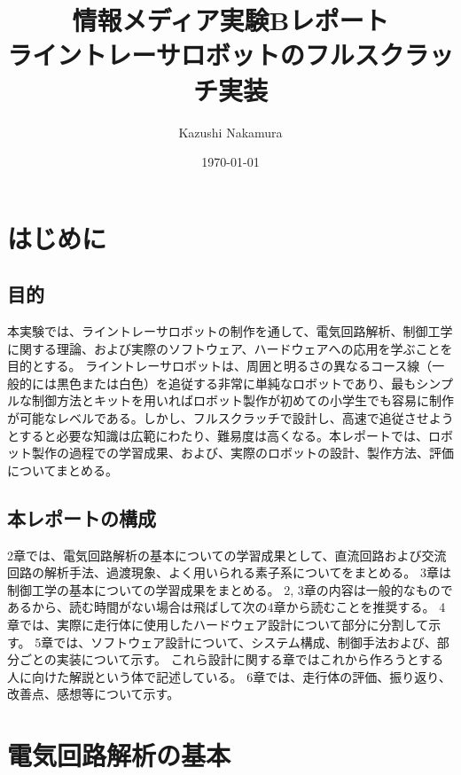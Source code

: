 \documentclass{ltjsreport}
\title{情報メディア実験Bレポート\\ライントレーサロボットのフルスクラッチ実装}
\author{Kazushi Nakamura}
\date{\today}
\begin{document}
\maketitle



\tableofcontents

\chapter{はじめに}


\section{目的}
本実験では、ライントレーサロボットの制作を通して、電気回路解析、制御工学に関する理論、および実際のソフトウェア、ハードウェアへの応用を学ぶことを目的とする。
ライントレーサロボットは、周囲と明るさの異なるコース線（一般的には黒色または白色）を追従する非常に単純なロボットであり、最もシンプルな制御方法とキットを用いればロボット製作が初めての小学生でも容易に制作が可能なレベルである。しかし、フルスクラッチで設計し、高速で追従させようとすると必要な知識は広範にわたり、難易度は高くなる。本レポートでは、ロボット製作の過程での学習成果、および、実際のロボットの設計、製作方法、評価についてまとめる。

\section{本レポートの構成}
2章では、電気回路解析の基本についての学習成果として、直流回路および交流回路の解析手法、過渡現象、よく用いられる素子系についてをまとめる。
3章は制御工学の基本についての学習成果をまとめる。
2, 3章の内容は一般的なものであるから、読む時間がない場合は飛ばして次の4章から読むことを推奨する。
4章では、実際に走行体に使用したハードウェア設計について部分に分割して示す。
5章では、ソフトウェア設計について、システム構成、制御手法および、部分ごとの実装について示す。
これら設計に関する章ではこれから作ろうとする人に向けた解説という体で記述している。
6章では、走行体の評価、振り返り、改善点、感想等について示す。

\chapter{電気回路解析の基本}
\end{document}

